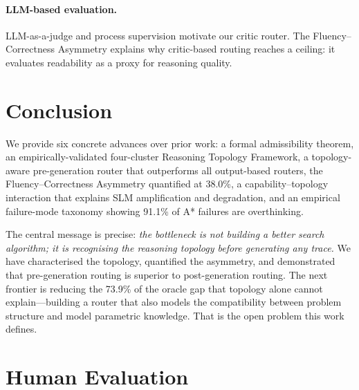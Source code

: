 \documentclass[11pt]{article}
\begin{document}
\paragraph{LLM-based evaluation.}
LLM-as-a-judge \citep{zheng2023judging} and process supervision \citep{lightman2023verify} motivate our critic router. The Fluency--Correctness Asymmetry explains why critic-based routing reaches a ceiling: it evaluates readability as a proxy for reasoning quality.

\section{Conclusion}
\label{sec:conclusion}

We provide six concrete advances over prior work: a formal admissibility theorem, an empirically-validated four-cluster Reasoning Topology Framework, a topology-aware pre-generation router that outperforms all output-based routers, the Fluency--Correctness Asymmetry quantified at 38.0\%, a capability--topology interaction that explains SLM amplification and degradation, and an empirical failure-mode taxonomy showing 91.1\% of A* failures are overthinking.

The central message is precise: \textit{the bottleneck is not building a better search algorithm; it is recognising the reasoning topology before generating any trace.} We have characterised the topology, quantified the asymmetry, and demonstrated that pre-generation routing is superior to post-generation routing. The next frontier is reducing the 73.9\% of the oracle gap that topology alone cannot explain—building a router that also models the compatibility between problem structure and model parametric knowledge. That is the open problem this work defines.




\appendix

\section{Human Evaluation}
\label{app:human}
\end{document}
